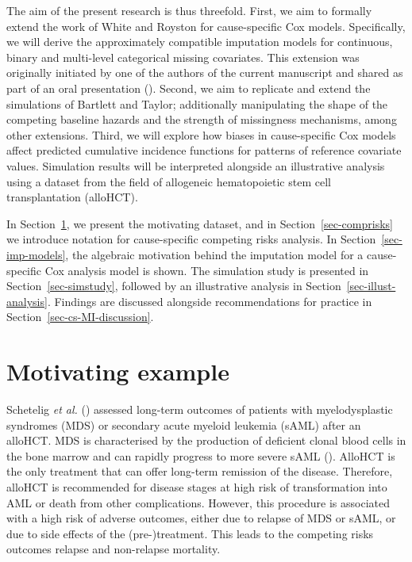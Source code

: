 \documentclass[
  letterpaper,
  paper=240mm:170mm,
  twoside=true,
  open=right,
  fontsize=10pt,
  pagesize=false,
  BCOR=15mm,
  DIV=14,
  headinclude=true,
  footinclude=false,
  headsepline=on]{scrbook}
\begin{document}
The aim of the present research is thus threefold. First, we aim to
formally extend the work of White and Royston for cause-specific Cox
models. Specifically, we will derive the approximately compatible
imputation models for continuous, binary and multi-level categorical
missing covariates. This extension was originally initiated by one of
the authors of the current manuscript and shared as part of an oral
presentation
(). Second, we aim to replicate and extend the
simulations of Bartlett and Taylor; additionally manipulating the shape
of the competing baseline hazards and the strength of missingness
mechanisms, among other extensions. Third, we will explore how biases in
cause-specific Cox models affect predicted cumulative incidence
functions for patterns of reference covariate values. Simulation results
will be interpreted alongside an illustrative analysis using a dataset
from the field of allogeneic hematopoietic stem cell transplantation
(alloHCT).

In Section~\ref{sec-motivating-example}, we present the motivating
dataset, and in Section~\ref{sec-comprisks} we introduce notation for
cause-specific competing risks analysis. In
Section~\ref{sec-imp-models}, the algebraic motivation behind the
imputation model for a cause-specific Cox analysis model is shown. The
simulation study is presented in Section~\ref{sec-simstudy}, followed by
an illustrative analysis in Section~\ref{sec-illust-analysis}. Findings
are discussed alongside recommendations for practice in
Section~\ref{sec-cs-MI-discussion}.

\section{Motivating example}\label{sec-motivating-example}

Schetelig \emph{et al.}
()
assessed long-term outcomes of patients with myelodysplastic syndromes
(MDS) or secondary acute myeloid leukemia (sAML) after an alloHCT. MDS
is characterised by the production of deficient clonal blood cells in
the bone marrow and can rapidly progress to more severe sAML
(). AlloHCT is the only treatment that can offer long-term remission
of the disease. Therefore, alloHCT is recommended for disease stages at
high risk of transformation into AML or death from other complications.
However, this procedure is associated with a high risk of adverse
outcomes, either due to relapse of MDS or sAML, or due to side effects
of the (pre-)treatment. This leads to the competing risks outcomes
relapse and non-relapse mortality.
\end{document}
